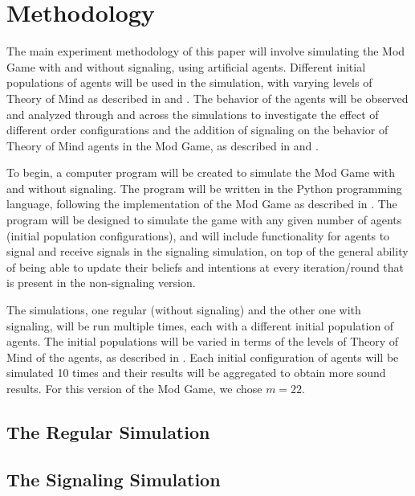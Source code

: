\section{Methodology}\label{sec:methodology}

The main experiment methodology of this paper will involve simulating the Mod Game with and without signaling, using artificial agents. Different initial populations of agents will be used in the simulation, with varying levels of Theory of Mind as described in \cite{premack1978does} and \cite{liddle2006higher}. The behavior of the agents will be observed and analyzed through and across the simulations to investigate the effect of different order configurations and the addition of signaling on the behavior of Theory of Mind agents in the Mod Game, as described in \cite{veltman2019training} and \cite{frey2013cyclic}.

To begin, a computer program will be created to simulate the Mod Game with and without signaling. The program will be written in the Python \citep{van1995python} programming language, following the implementation of the Mod Game as described in \cite{veltman2019training}. The program will be designed to simulate the game with any given number of agents (initial population configurations), and will include functionality for agents to signal and receive signals in the signaling simulation, on top of the general ability of being able to update their beliefs and intentions at every iteration/round that is present in the non-signaling version.

The simulations, one regular (without signaling) and the other one with signaling, will be run multiple times, each with a different initial population of agents. The initial populations will be varied in terms of the levels of Theory of Mind of the agents, as described in \cite{de2013much}. Each initial configuration of agents will be simulated 10 times and their results will be aggregated to obtain more sound results. For this version of the Mod Game, we chose $m = 22$.

\subsection{The Regular Simulation}



\subsection{The Signaling Simulation}


